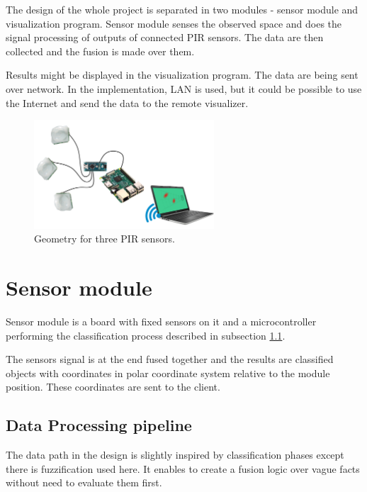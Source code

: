 The design of the whole project is separated in two modules - sensor module
and visualization program. Sensor module senses the observed space and does the
signal processing of outputs of connected PIR sensors. The data are then collected
and the fusion is made over them.

Results might be displayed in the visualization program. The data are being sent
over network. In the implementation, LAN is used, but it could be possible to
use the Internet and send the data to the remote visualizer.

\begin{figure}[h!]
\begin{center}
\includegraphics[width=0.6\textwidth]{obrazky-figures/design.png}
\caption{Geometry for three PIR sensors.\label{fig:design}}
\end{center}
\end{figure}

\section{Sensor module}

Sensor module is a board with fixed sensors on it and a microcontroller performing the
classification process described in subsection \ref{label:dataprocessing}.

The sensors signal is at the end fused together and the results are classified objects
with coordinates in polar coordinate system relative to the module position. These
coordinates are sent to the client.


\subsection{Data Processing pipeline}
\label{label:dataprocessing}

The data path in the design is slightly inspired by classification phases except
there is fuzzification used here. It enables to create a fusion logic over vague
facts without need to evaluate them first.

